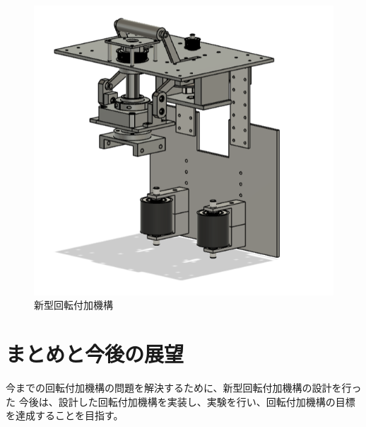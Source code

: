 \documentclass{classes/sice-si}
\begin{document}
\begin{figure}[b]
    \centering
    \begin{minipage}{0.5\linewidth}
        \centering
        \includegraphics[width=\linewidth]{figures/4.png}
        \caption{新型回転付加機構}
        \label{fig:new}
    \end{minipage}
    \hfill
    \vspace{0pt} %
\end{figure}



\section{まとめと今後の展望}
今までの回転付加機構の問題を解決するために、新型回転付加機構の設計を行った
今後は、設計した回転付加機構を実装し、実験を行い、回転付加機構の目標を達成することを目指す。



\printbibliography[title=参考文献]
\end{document}
